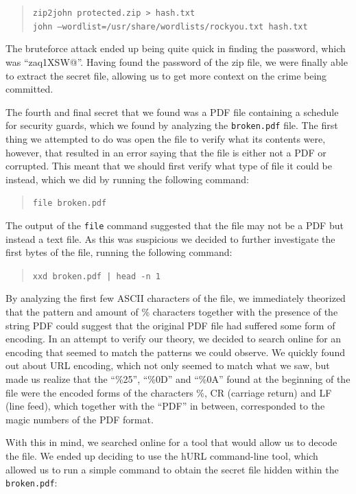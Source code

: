 \documentclass[11pt,a4paper,final,oneside]{article}
\begin{document}
\begin{quote}
\texttt{zip2john protected.zip > hash.txt}\\
\texttt{john --wordlist=/usr/share/wordlists/rockyou.txt hash.txt}
\end{quote}

The bruteforce attack ended up being quite quick in finding the password, which was ``zaq1XSW@''. Having found the password of the zip file, we were finally able to extract the secret file, allowing us to get more context on the crime being committed.

The fourth and final secret that we found was a PDF file containing a schedule for security guards, which we found by analyzing the \texttt{broken.pdf} file. The first thing we attempted to do was open the file to verify what its contents were, however, that resulted in an error saying that the file is either not a PDF or corrupted. This meant that we should first verify what type of file it could be instead, which we did by running the following command:

\begin{quote}
\texttt{file broken.pdf}
\end{quote}

The output of the \texttt{file} command suggested that the file may not be a PDF but instead a text file. As this was suspicious we decided to further investigate the first bytes of the file, running the following command:

\begin{quote}
\texttt{xxd broken.pdf | head -n 1}
\end{quote}

By analyzing the first few ASCII characters of the file, we immediately theorized that the pattern and amount of \% characters together with the presence of the string PDF could suggest that the original PDF file had suffered some form of encoding. In an attempt to verify our theory, we decided to search online for an encoding that seemed to match the patterns we could observe. We quickly found out about URL encoding, which not only seemed to match what we saw, but made us realize that the ``\%25'', ``\%0D'' and ``\%0A'' found at the beginning of the file were the encoded forms of the characters \%, CR (carriage return) and LF (line feed), which together with the ``PDF'' in between, corresponded to the magic numbers of the PDF format.

With this in mind, we searched online for a tool that would allow us to decode the file. We ended up deciding to use the hURL command-line tool, which allowed us to run a simple command to obtain the secret file hidden within the \texttt{broken.pdf}:
\end{document}
